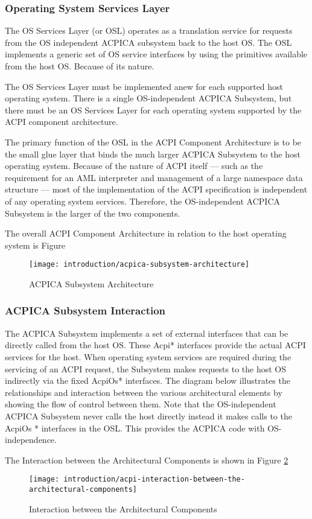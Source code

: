 \subsubsection{Operating System Services Layer}
The OS Services Layer (or OSL) operates as a translation service for requests from the OS independent ACPICA subsystem back to the host OS. The OSL implements a generic set of OS service interfaces by using the primitives available from the host OS. Because of its nature.

The OS Services Layer must be implemented anew for each supported host operating
system. There is a single OS-independent ACPICA Subsystem, but there must be an OS Services
Layer for each operating system supported by the ACPI component architecture.

The primary function of the OSL in the ACPI Component Architecture is to be the small
glue layer that binds the much larger ACPICA Subsystem to the host operating system. Because
of the nature of ACPI itself — such as the requirement for an AML interpreter and management
of a large namespace data structure — most of the implementation of the ACPI specification is
independent of any operating system services. Therefore, the OS-independent ACPICA Subsystem
is the larger of the two components.

The overall ACPI Component Architecture in relation to the host operating system is Figure

\begin{figure}[h]
	\centering
	\texttt{[image: introduction/acpica-subsystem-architecture]}
	\caption{ACPICA Subsystem Architecture}\label{fig:introduction-acpica-subsystem-architecture}
\end{figure}

\subsubsection{ACPICA Subsystem Interaction}
The ACPICA Subsystem implements a set of external interfaces that can be directly called from
the host OS. These Acpi* interfaces provide the actual ACPI services for the host. When operating
system services are required during the servicing of an ACPI request, the Subsystem makes
requests to the host OS indirectly via the fixed AcpiOs* interfaces. The diagram below illustrates
the relationships and interaction between the various architectural elements by showing the flow
of control between them. Note that the OS-independent ACPICA Subsystem never calls the host directly instead it makes calls to the AcpiOs * interfaces in the OSL. This provides the ACPICA
code with OS-independence.

The Interaction between the Architectural Components is shown in Figure \ref{fig:-introduction-acpi-interaction-between-the-architectural-components}

\begin{figure}[h]
	\centering
	\texttt{[image: introduction/acpi-interaction-between-the-architectural-components]}
	\caption{Interaction between the Architectural Components}\label{fig:-introduction-acpi-interaction-between-the-architectural-components}
\end{figure}

